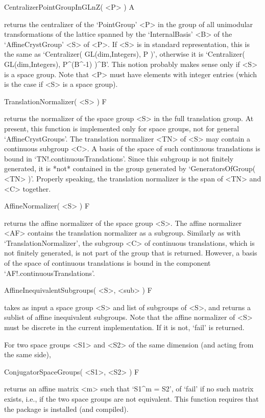 \>CentralizerPointGroupInGLnZ( <P> ) A

returns the centralizer of the `PointGroup' <P> in the group of 
all unimodular transformations of the lattice spanned by the
`InternalBasis' <B> of the `AffineCrystGroup' <S> of <P>. 
If <S> is in standard representation, this is the same as 
`Centralizer( GL(dim,Integers), P )', otherwise it is
`Centralizer( GL(dim,Integers), P^(B^-1) )^B'. This notion
probably makes sense only if <S> is a space group. Note that 
<P> must have elements with integer entries (which is the case 
if <S> is a space group).

\>TranslationNormalizer( <S> ) F

returns the normalizer of the space group <S> in the full translation
group. At present, this function is implemented only for space groups,
not for general `AffineCrystGroups'.  The translation normalizer <TN>
of <S> may contain a continuous subgroup <C>.  A basis of the space of
such continuous translations is bound in `TN!.continuousTranslations'.
Since this subgroup is not finitely generated, it is *not* contained
in the group generated by `GeneratorsOfGroup( <TN> )'. Properly speaking, 
the translation normalizer is the span of <TN> and <C> together.

\>AffineNormalizer( <S> ) F

returns the affine normalizer of the space group <S>.  The affine
normalizer <AF> contains the translation normalizer as a subgroup.
Similarly as with `TranslationNormalizer', the subgroup <C> of
continuous translations, which is not finitely generated, is not part
of the group that is returned.  However, a basis of the space of
continuous translations is bound in the component 
`AF!.continuousTranslations'.

\>AffineInequivalentSubgroups( <S>, <sub> ) F

takes as input a space group <S> and list of subgroups of <S>,
and returns a sublist of affine inequivalent subgroups.
Note that the affine normalizer of <S> must be discrete in the
current implementation. If it is not, `fail' is returned. 

For two space groups <S1> and <S2> of the same dimension (and
acting from the same side), 

\>ConjugatorSpaceGroups( <S1>, <S2> ) F

returns an affine matrix <m> such that `S1\^{}m = S2', of `fail'
if no such matrix exists, i.e., if the two space groups are not
equivalent. This function requires that the {\GAP} package
{\CaratInterface} is installed (and compiled).

